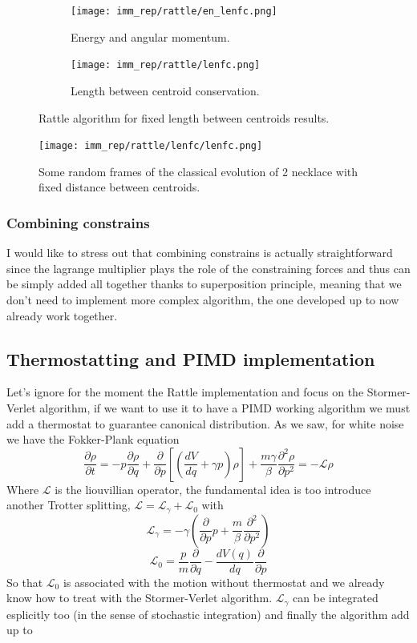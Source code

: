 \documentclass[10pt,a4paper]{article}
\begin{document}
\begin{figure}[h]
	\begin{center}
		\begin{subfigure}[b]{0.4\textwidth}
			\centering
			\texttt{[image: imm\_rep/rattle/en\_lenfc.png]}
			\caption{Energy and angular momentum.}
			\label{subfig: en_lenfc}
		\end{subfigure}
		\begin{subfigure}[b]{0.4\textwidth}
			\centering
			\texttt{[image: imm\_rep/rattle/lenfc.png]}
			\caption{Length between centroid conservation.}
			\label{subfig: lc}
		\end{subfigure}
		\caption{Rattle algorithm for fixed length between centroids results.}
	\end{center}
	\label{fig: lenfc}
\end{figure}

\begin{figure}[h]
	\begin{center}
		\texttt{[image: imm\_rep/rattle/lenfc/lenfc.png]}
	\end{center}
	\caption{Some random frames of the classical evolution of 2 necklace with fixed distance between centroids.}
	\label{fig: lenfc1}
\end{figure}


\subsubsection{Combining constrains}
I would like to stress out that combining constrains is actually straightforward since the lagrange multiplier plays the role of the constraining forces and thus can be simply added all together thanks to superposition principle, meaning that we don't need to implement more complex algorithm, the one developed up to now already work together.
\subsection{Thermostatting and PIMD implementation}
Let's ignore for the moment the Rattle implementation and focus on the Stormer-Verlet algorithm, if we want to use it to have a PIMD working algorithm we must add a thermostat to guarantee canonical distribution. As we saw, for white noise we have the Fokker-Plank equation
\[ \frac{\partial\rho}{\partial t} = -p\frac{\partial\rho}{\partial q}+\frac{\partial}{\partial p}[(\frac{dV}{dq}+\gamma p)\rho]+\frac{m\gamma}{\beta}\frac{\partial^2\rho}{\partial p^2} = -\mathcal{L}\rho\] 
Where $\mathcal{L}$ is the liouvillian operator, the fundamental idea is too introduce another Trotter splitting, $\mathcal{L}=\mathcal{L}_\gamma+\mathcal{L}_0$ with 
\[ \mathcal{L}_\gamma = -\gamma(\frac{\partial}{\partial p}p + \frac{m}{\beta}\frac{\partial^2}{\partial p^2})   \]
\[ \mathcal{L}_0 = \frac{p}{m}\frac{\partial}{\partial q}-\frac{dV(q)}{dq} \frac{\partial}{\partial p}  \]
So that $ \mathcal{L}_0$ is associated with the motion without thermostat and we already know how to treat with the Stormer-Verlet algorithm.
$ \mathcal{L}_\gamma$ can be integrated esplicitly too (in the sense of stochastic integration) and finally the algorithm add up to 
\end{document}
